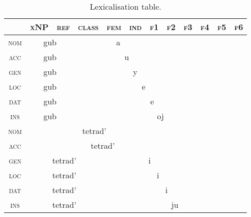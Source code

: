 
\begin{table}[H]
\centering
\begin{tabular}{c c c c c c c c c c c c}
\toprule
\textsc{}&\textsc{xNP}&\textsc{ref}&\textsc{class}&\textsc{fem}&\textsc{ind}&\textsc{f1}&\textsc{f2}&\textsc{f3}&\textsc{f4}&\textsc{f5}&\textsc{f6}\\
\midrule
\textsc{nom}&\multicolumn{2}{|c|}{\cellcolor{gray!70}gub}&\multicolumn{4}{c}{\cellcolor{gray!30}a}&&&&&\\
\textsc{acc}&\multicolumn{2}{|c|}{\cellcolor{gray!70}gub}&\multicolumn{5}{c}{\cellcolor{gray!30}u}&&&&\\
\textsc{gen}&\multicolumn{2}{|c|}{\cellcolor{gray!70}gub}&\multicolumn{6}{c}{\cellcolor{gray!30}y}&&&\\
\textsc{loc}&\multicolumn{2}{|c|}{\cellcolor{gray!70}gub}&\multicolumn{7}{c}{\cellcolor{gray!30}e}&&\\
\textsc{dat}&\multicolumn{2}{|c|}{\cellcolor{gray!70}gub}&\multicolumn{8}{c}{\cellcolor{gray!30}e}&\\
\textsc{ins}&\multicolumn{2}{|c|}{\cellcolor{gray!70}gub}&\multicolumn{9}{c}{\cellcolor{gray!30}oj}\\
\midrule
\textsc{nom}&\multicolumn{6}{|c|}{\cellcolor{gray!70}tetrad'}&&&&&\\
\textsc{acc}&\multicolumn{7}{|c|}{\cellcolor{gray!70}tetrad'}&&&&\\
\textsc{gen}&\multicolumn{3}{|c|}{\cellcolor{gray!70}tetrad'}&\multicolumn{5}{c}{\cellcolor{gray!30}i}&&&\\
\textsc{loc}&\multicolumn{3}{|c|}{\cellcolor{gray!70}tetrad'}&\multicolumn{6}{c}{\cellcolor{gray!30}i}&&\\
\textsc{dat}&\multicolumn{3}{|c|}{\cellcolor{gray!70}tetrad'}&\multicolumn{7}{c}{\cellcolor{gray!30}i}&\\
\textsc{ins}&\multicolumn{3}{|c|}{\cellcolor{gray!70}tetrad'}&\multicolumn{8}{c}{\cellcolor{gray!30}ju}\\
\bottomrule
\end{tabular}
\caption{Lexicalisation table.}
\label{tab:iifem}
\end{table}


\usepackage{pifont}



